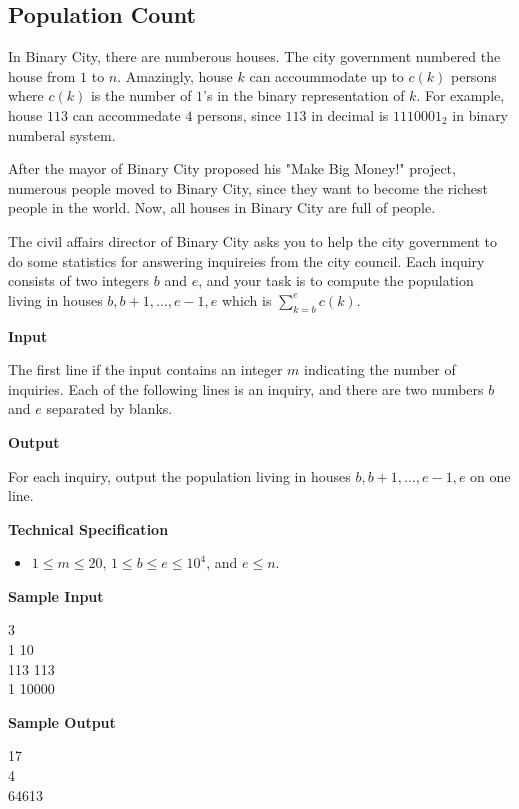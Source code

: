 \subsection{Population Count}
In Binary City, there are numberous houses. The city government numbered the house from $1$ to $n$. Amazingly, house $k$ can accoummodate up to $c(k)$ persons where $c(k)$ is the number of $1$'s in the binary representation of $k$. For example, house $113$ can accommedate $4$ persons, since $113$ in decimal is $1110001_2$ in binary numberal system.

After the mayor of Binary City proposed his "Make Big Money!" project, numerous people moved to Binary City, since they want to become the richest people in the world. Now, all houses in Binary City are full of people.

The civil affairs director of Binary City asks you to help the city government to do some statistics for answering inquireies from the city council. Each inquiry consists of two integers $b$ and $e$, and your task is to compute the population living in houses $b, b+1, ..., e-1, e$ which is $\sum_{k=b}^e c(k)$.

\begin{flushleft}
{\color{red} \textbf{Input}}
\end{flushleft}
The first line if the input contains an integer $m$ indicating the number of inquiries. Each of the following lines is an inquiry, and there are two numbers $b$ and $e$ separated by blanks.

\begin{flushleft}
{\color{red} \textbf{Output}}
\end{flushleft}
For each inquiry, output the population living in houses $b, b+1, ..., e-1, e$ on one line.

\begin{flushleft}
{\color{red} \textbf{Technical Specification}}
\end{flushleft}
\begin{itemize}
\item $1 \leq m \leq 20$, $1 \leq b \leq e \leq 10^4$, and $e \leq n$.
\end{itemize}

\begin{flushleft}
{\color{red} \textbf{Sample Input}}
\end{flushleft}
\begin{flushleft}
3\\
1 10\\
113 113\\
1 10000\\
\end{flushleft}

\begin{flushleft}
{\color{red} \textbf{Sample Output}}
\end{flushleft}
\begin{flushleft}
17\\
4\\
64613\\
\end{flushleft}

\newpage